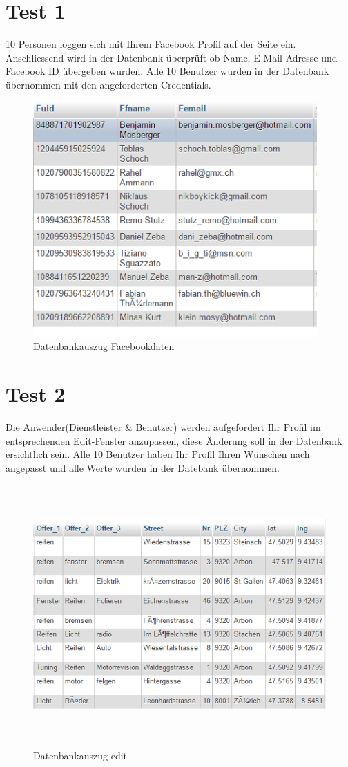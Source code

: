 \documentclass[11pt,a4paper]{scrreprt}
\begin{document}
{\section{Test 1}
10 Personen loggen sich mit Ihrem Facebook Profil auf der Seite ein. Anschliessend wird in der Datenbank überprüft ob Name, E-Mail Adresse und Facebook ID übergeben wurden. Alle 10 Benutzer wurden in der Datenbank übernommen mit den angeforderten Credentials. 
\newline
\begin{figure}[H]
\includegraphics[height=9cm]{./Bilder/database.png}
\centering
\caption{Datenbankauszug Facebookdaten}
\end{figure}
\newpage


\section{Test 2}
Die Anwender(Dienstleister \& Benutzer) werden aufgefordert Ihr Profil im entsprechenden Edit-Fenster anzupassen, diese Änderung soll in der Datenbank ersichtlich sein. Alle 10 Benutzer haben Ihr Profil Ihren Wünschen nach angepasst und alle Werte wurden in der Datebank übernommen.
\newline
\begin{figure}[H]
\includegraphics[height=10cm]{./Bilder/edit.png}
\centering
\caption{Datenbankauszug edit}
\end{figure}
\newpage


}
\end{document}
